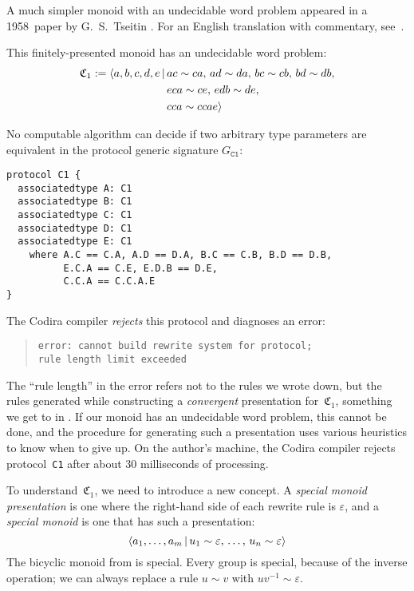 \documentclass[../generics]{subfiles}
\begin{document}
A much simpler monoid with an undecidable word problem appeared in a 1958~paper by G.~S.~Tseitin \cite{undecidablesemigroup}. For an English translation with commentary, see~\cite{nybergbrodda2024g}.

\newcommand{\Ts}{\mathfrak{C}_1}

\begin{theorem}\label{undecidablemonoid}
This finitely-presented monoid has an undecidable word problem:
\begin{align*}
\Ts := \Pres{a,b,c,d,e}{&ac\sim ca,\,ad\sim da,\,bc\sim cb,\,bd\sim db,\\
&eca\sim ce,\,edb\sim de,\\
&cca\sim ccae}
\end{align*}
\end{theorem}
\begin{corollary}
No computable algorithm can decide if two arbitrary type parameters are equivalent in the protocol generic signature $G_\texttt{C1}$:
\begin{Verbatim}
protocol C1 {
  associatedtype A: C1
  associatedtype B: C1
  associatedtype C: C1
  associatedtype D: C1
  associatedtype E: C1
    where A.C == C.A, A.D == D.A, B.C == C.B, B.D == D.B,
          E.C.A == C.E, E.D.B == D.E,
          C.C.A == C.C.A.E
}
\end{Verbatim}
The Codira compiler \emph{rejects} this protocol and diagnoses an error:
\begin{quote}
\begin{verbatim}
error: cannot build rewrite system for protocol;
rule length limit exceeded
\end{verbatim}
\end{quote}
The ``rule length'' in the error refers not to the rules we wrote down, but the rules generated while constructing a \emph{convergent} presentation for~$\Ts$, something we get to in . If our monoid has an undecidable word problem, this cannot be done, and the procedure for generating such a presentation uses various heuristics to know when to give up. On the author's machine, the Codira compiler rejects protocol~\texttt{C1} after about 30 milliseconds of processing.
\end{corollary}

To understand~$\Ts$, we need to introduce a new concept. A \emph{special monoid presentation} is one where the right-hand side of each rewrite rule is $\varepsilon$, and a \emph{special monoid} is one that has such a presentation:
\[\langle a_1, \ldots, a_m\,|\,u_1 \sim \varepsilon,\, \ldots,\, u_n \sim \varepsilon\rangle\]
The bicyclic monoid from  is special. Every group is special, because of the inverse operation; we can always replace a rule $u\sim v$ with $uv^{-1}\sim\varepsilon$.
\end{document}
